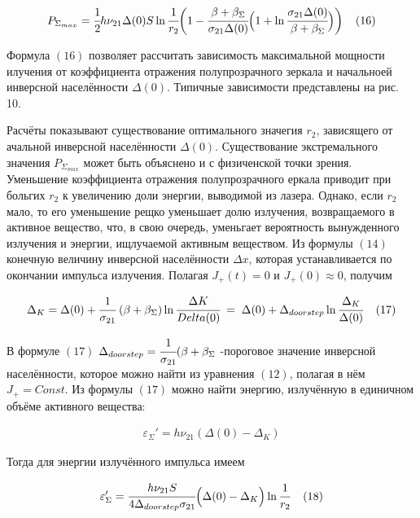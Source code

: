 \documentclass[a4paper,14pt,russian]{article}
\begin{document}
\begin{eqnarray}
P_{\Sigma_{max}} = \cfrac {1} {2} h \nu_{21} \Delta(0) S \ln \cfrac {1} {r_2} \bigg( 1 - \cfrac {\beta + \beta_{\Sigma}} {\sigma_{21} \Delta(0)} \Big( 1 + \ln \cfrac {\sigma_{21} \Delta(0)} {\beta + \beta_{\Sigma}} \Big) \bigg) \;\;\;\; (16)
\end{eqnarray}

Формула $(16)$ позволяет рассчитать зависимость максимальной мощности илучения от коэффициента отражения полупрозрачного зеркала и начальноей инверсной населённости $\Delta(0)$. Типичные зависимости представлены на рис. 10.

Расчёты показывают существование оптимального значегия $r_2$, зависящего от ачальной инверсной населённости $\Delta(0)$. Существование экстремального значения $P_{\Sigma_{max}}$ может быть объяснено и с физиченской точки зрения. Уменьшение коэффициента отражения полупрозрачного еркала приводит при больгих $r_2$ к увеличению доли энергии, выводимой из лазера. Однако, если $r_2$ мало, то его уменьшение рещко уменьшает долю излучения, возвращаемого в активное вещество, что, в свою очередь, уменьгает вероятность вынужденного излучения и энергии, ищлучаемой активным веществом. Из формулы $(14)$ конечную величину инверсной населённости $\Delta x$, которая устанавливается по окончании импульса излучения. Полагая $J_+(t) = 0$ и $J_+ (0) \approx 0$, получим

\begin{eqnarray}
\Delta_K = \Delta(0) + \cfrac {1} {\sigma_{21}} \; (\beta + \beta_{\Sigma}) \ln \cfrac {\Delta K} {Delta(0)} \; = \; \Delta(0) + \Delta_{doorstep} \ln \cfrac {\Delta_K} {\Delta (0)} \;\;\;\; (17)
\end{eqnarray}

В формуле $(17)$ $\Delta_{doorstep} = \cfrac {1} {\sigma_{21}} (\beta + \beta_{\Sigma}$ -пороговое значение инверсной населённости, которое можно найти из уравнения $(12)$, полагая в нём $J_+ = Const$. Из формулы $(17)$ можно найти энергию, излучённую в единичном объёме активного вещества:

\begin{eqnarray}
\varepsilon_{\Sigma}' = h \nu_{21} (\Delta (0) - \Delta_K)
\end{eqnarray}

Тогда для энергии излучённого импульса имеем

\begin{eqnarray}
\varepsilon_{\Sigma}' = \cfrac {h \nu_{21} S} {4 \Delta_{doorstep} \sigma_{21}} \Big( \Delta(0) - \Delta_K \Big) \ln \cfrac {1} {r_2} \;\;\;\; (18)
\end{eqnarray}
\end{document}
